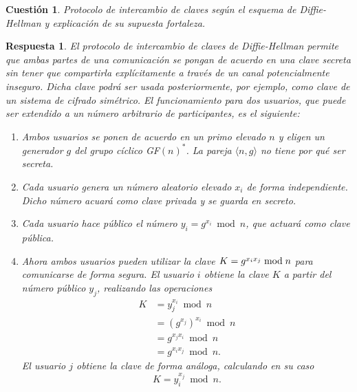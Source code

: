 \documentclass[
  a4paper,
  spanish,
  12pt,
]{scrartcl}
\theoremstyle{ejercicio-style}
\newtheorem{ejer}{Cuestión}
\theoremstyle{remark-style}
\newtheorem*{sol}{Respuesta}
\theoremstyle{teorema-style}
\begin{document}
\begin{ejer}
  Protocolo de intercambio de claves según el esquema de Diffie-Hellman y explicación de su supuesta fortaleza.
  \label{q:6}
\end{ejer}

\begin{sol}
  El protocolo de intercambio de claves de Diffie-Hellman permite que ambas partes de una comunicación se pongan de acuerdo en una clave secreta sin tener que compartirla explícitamente a través de un canal potencialmente inseguro. Dicha clave podrá ser usada posteriormente, por ejemplo, como clave de un sistema de cifrado simétrico.
  El funcionamiento para dos usuarios, que puede ser extendido a un número arbitrario de participantes, es el siguiente:
  \begin{enumerate}
    \item Ambos usuarios se ponen de acuerdo en un primo elevado $n$ y eligen un generador $g$ del grupo cíclico GF$(n)^\ast$. La pareja $\langle n, g \rangle$ no tiene por qué ser secreta.
    \item Cada usuario genera un número aleatorio elevado \(x_i\) de forma independiente. Dicho número acuará como \textit{clave privada} y se guarda en secreto.
    \item Cada usuario hace público el número $y_i = g^{x_i} \bmod n$, que actuará como \textit{clave pública}.
    \item Ahora ambos usuarios pueden utilizar la clave \(K = \cramped{g^{x_ix_j}} \bmod n\) para comunicarse de forma segura.
    El usuario \(i\) obtiene la clave \(K\) a partir del número público \(y_j\), realizando las operaciones \begin{align*}
      K &= y_j^{x_i} \bmod n \\
        &= (g^{x_j})^{x_i} \bmod n \\
        &= g^{x_jx_i} \bmod n \\
        &= g^{x_ix_j} \bmod n.
    \end{align*}
    El usuario \(j\) obtiene la clave de forma análoga, calculando en su caso \[K = y_i^{x_j} \bmod n.\]
  \end{enumerate}


\end{sol}
\end{document}
